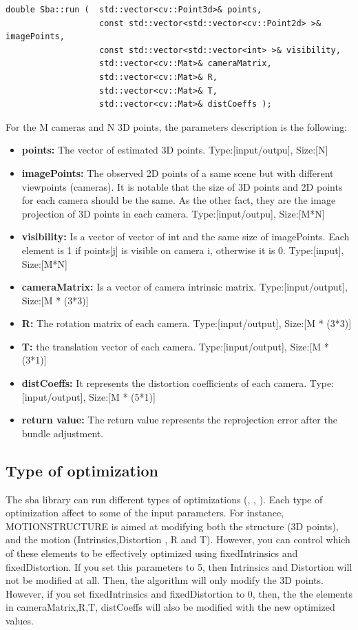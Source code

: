 \begin{lstlisting}
double Sba::run (  std::vector<cv::Point3d>& points,
                   const std::vector<std::vector<cv::Point2d> >& imagePoints,
                   const std::vector<std::vector<int> >& visibility,
                   std::vector<cv::Mat>& cameraMatrix,
                   std::vector<cv::Mat>& R,
                   std::vector<cv::Mat>& T,
                   std::vector<cv::Mat>& distCoeffs );

\end{lstlisting} \label{lst:cvsba}
For the M cameras and N 3D points, the parameters description is the following:
\begin{itemize}
\item \textbf{points:} The vector of estimated 3D points. Type:[input/outpu], Size:[N]
\item \textbf{imagePoints:} The observed 2D points of a same scene but with different viewpoints (cameras). It is notable that the size of 3D points and 2D points for each camera should be the same. As the other fact, they are the image projection of 3D points in each camera. Type:[input/outpu], Size:[M*N]
\item \textbf{visibility:} Is a vector of vector of int and the same size of imagePoints. Each element is 1 if points[j] is visible on camera i, otherwise it is 0. Type:[input], Size:[M*N] 
\item \textbf{cameraMatrix:} Is a vector of camera intrinsic matrix. Type:[input/output], Size:[M * (3*3)]
\item \textbf{R:} The rotation matrix of each camera. Type:[input/output], Size:[M * (3*3)]
\item \textbf{T:} the translation vector of each camera. Type:[input/output], Size:[M * (3*1)]
\item \textbf{distCoeffs:} It represents the distortion coefficients of each camera. Type:[input/output], Size:[M * (5*1)]
\item \textbf{return value:} The return value represents the reprojection error after the bundle adjustment.
\end{itemize}
\subsection{Type of optimization}
The sba library can run different types of optimizations (, , ). Each type of optimization affect to some of the input parameters. For instance, MOTIONSTRUCTURE is aimed at modifying both the structure (3D points), and the motion (Intrinsics,Distortion , R and T). However, you can control which of these elements to be effectively optimized using fixedIntrinsics and fixedDistortion. If you set this parameters to 5, then Intrinsics and Distortion will not be modified at all. Then, the algorithm will only modify the 3D points. However, if you set  fixedIntrinsics and fixedDistortion to 0, then,  the the elements in cameraMatrix,R,T, distCoeffs will also be modified with the new optimized values.

